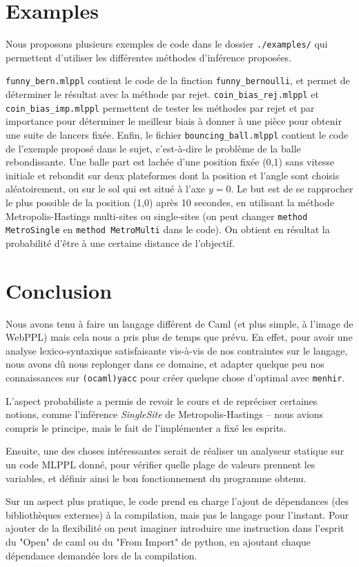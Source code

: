 \documentclass[svgnames]{article}
\begin{document}
\section{Examples}

Nous proposons plusieurs exemples de code dans le dossier \verb|./examples/| qui permettent d'utiliser les différentes méthodes d'inférence proposées.

\verb|funny_bern.mlppl| contient le code de la finction \verb|funny_bernoulli|, et permet de déterminer le résultat avec la méthode par rejet. \verb|coin_bias_rej.mlppl| et \verb|coin_bias_imp.mlppl| permettent de tester les méthodes par rejet et par importance pour déterminer le meilleur biais à donner à une pièce pour obtenir une suite de lancers fixée. Enfin, le fichier \verb|bouncing_ball.mlppl| contient le code de l'exemple proposé dans le sujet, c'est-à-dire le problème de la balle rebondissante. Une balle part est lachée d'une position fixée (0,1) sans vitesse initiale et rebondit sur deux plateformes dont la position et l'angle sont choisis aléatoirement, ou sur le sol qui est situé à l'axe $y=0$. Le but est de se rapprocher le plus possible de la position (1,0) après 10 secondes, en utilisant la méthode Metropolis-Hastings multi-sites ou single-sites (on peut changer \verb|method MetroSingle| en \verb|method MetroMulti| dans le code). On obtient en résultat la probabilité d'être à une certaine distance de l'objectif.

\section{Conclusion}
 

Nous avons tenu à faire un langage différent de Caml (et plus simple, à l'image de WebPPL) mais cela nous a pris plus de temps que prévu. En effet, pour avoir une analyse lexico-syntaxique satisfaisante vis-à-vis de nos contraintes sur le langage, nous avons dû nous replonger dans ce domaine, et adapter quelque peu nos connaissances sur  \verb|(ocaml)yacc| pour créer quelque chose d'optimal avec \verb|menhir|.

L'aspect probabiliste a permis de revoir le cours et de repréciser certaines notions, comme l'inférence \emph{SingleSite} de Metropolis-Hastings -- nous avions compris le principe, mais le fait de l'implémenter a fixé les esprits.

\bigskip

Ensuite, une des choses intéressantes serait de réaliser un analyseur statique sur un code MLPPL donné, pour vérifier quelle plage de valeurs prennent les variables, et définir ainsi le bon fonctionnement du programme obtenu.

Sur un aspect plus pratique, le code prend en charge l'ajout de dépendances (des bibliothèques externes) à la compilation, mais pas le langage pour l'instant. Pour ajouter de la flexibilité on peut imaginer introduire une instruction dans l'esprit du "Open" de caml ou du "From Import" de python, en ajoutant chaque dépendance demandée lors de la compilation.
\end{document}
